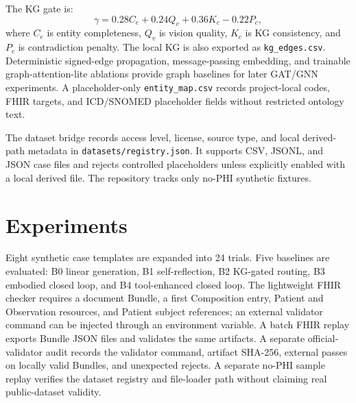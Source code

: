 \documentclass[11pt]{article}
\begin{document}
The KG gate is:
\begin{equation}
\gamma = 0.28 C_e + 0.24 Q_v + 0.36 K_c - 0.22 P_c,
\end{equation}
where $C_e$ is entity completeness, $Q_v$ is vision quality, $K_c$ is KG consistency, and $P_c$ is contradiction penalty.
The local KG is also exported as \texttt{kg\_edges.csv}. Deterministic signed-edge propagation, message-passing embedding, and trainable graph-attention-lite ablations provide graph baselines for later GAT/GNN experiments. A placeholder-only \texttt{entity\_map.csv} records project-local codes, FHIR targets, and ICD/SNOMED placeholder fields without restricted ontology text.

The dataset bridge records access level, license, source type, and local derived-path metadata in \texttt{datasets/registry.json}. It supports CSV, JSONL, and JSON case files and rejects controlled placeholders unless explicitly enabled with a local derived file. The repository tracks only no-PHI synthetic fixtures.

\section{Experiments}
Eight synthetic case templates are expanded into 24 trials. Five baselines are evaluated: B0 linear generation, B1 self-reflection, B2 KG-gated routing, B3 embodied closed loop, and B4 tool-enhanced closed loop. The lightweight FHIR checker requires a document Bundle, a first Composition entry, Patient and Observation resources, and Patient subject references; an external validator command can be injected through an environment variable. A batch FHIR replay exports Bundle JSON files and validates the same artifacts. A separate official-validator audit records the validator command, artifact SHA-256, external passes on locally valid Bundles, and unexpected rejects. A separate no-PHI sample replay verifies the dataset registry and file-loader path without claiming real public-dataset validity.
\end{document}
